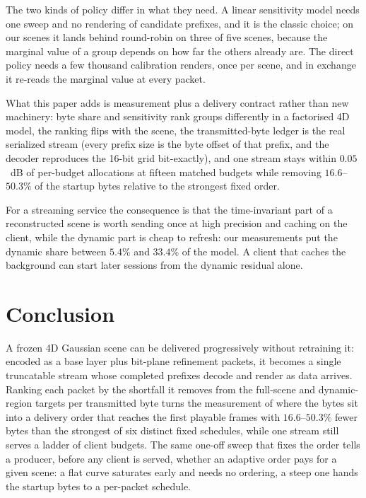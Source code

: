 \documentclass[lettersize,journal]{IEEEtran}
\begin{document}
The two kinds of policy differ in what they need. A linear sensitivity model
needs one sweep and no rendering of candidate prefixes, and it is the classic
choice; on our scenes it lands behind round-robin on three of five scenes,
because the marginal value of a group depends on how far the others already are.
The direct policy needs a few thousand calibration renders, once per scene, and
in exchange it re-reads the marginal value at every packet.

What this paper adds is measurement plus a delivery contract rather than new
machinery: byte share and sensitivity rank groups differently in a factorised 4D
model, the ranking flips with the scene, the transmitted-byte ledger is the real
serialized stream (every prefix size is the byte offset of that prefix, and the
decoder reproduces the 16-bit grid bit-exactly), and one stream stays within
$0.05$~dB of per-budget allocations at fifteen matched budgets while removing
$16.6$--$50.3\%$ of the startup bytes relative to the strongest fixed order.

For a streaming service the consequence is that the time-invariant part of a
reconstructed scene is worth sending once at high precision and caching on the
client, while the dynamic part is cheap to refresh: our measurements put the
dynamic share between $5.4\%$ and $33.4\%$ of the model. A client that caches the
background can start later sessions from the dynamic residual alone.

\section{Conclusion}
\label{sec:conclusion}
A frozen 4D Gaussian scene can be delivered progressively without retraining it:
encoded as a base layer plus bit-plane refinement packets, it becomes a single
truncatable stream whose completed prefixes decode and render as data arrives.
Ranking each packet by the shortfall it removes from the full-scene and
dynamic-region targets per transmitted byte turns the measurement of where the
bytes sit into a delivery order that reaches the first playable frames with
$16.6$--$50.3\%$ fewer bytes than the strongest of six distinct fixed schedules, while one
stream still serves a ladder of client budgets. The same one-off sweep that fixes the order
tells a producer, before any client is served, whether an adaptive order pays for
a given scene: a flat curve saturates early and needs no ordering, a steep one
hands the startup bytes to a per-packet schedule.
\end{document}
